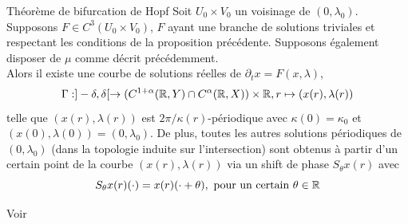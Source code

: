\documentclass[memoire.tex]{subfiles}
\begin{document}
    \begin{theobox}{Théorème de bifurcation de Hopf}{}
        Soit $U_0\times V_0$ un voisinage de $(0,\lambda_0)$. Supposons $F\in C^3(U_0\times V_0)$, $F$ ayant une branche de solutions triviales et respectant les conditions de la proposition précédente. Supposons également disposer de $\mu$ comme décrit précédemment.\\
        Alors il existe une courbe de solutions réelles de $\partial_t x=F(x,\lambda)$,
        \begin{equation*}
            \Gamma: ]-\delta,\delta[\rightarrow (C^{1+\alpha}(\mathbb{R},Y)\cap C^{\alpha}(\mathbb{R},X))\times \mathbb{R}, r\mapsto (x(r),\lambda(r))
        \end{equation*}
        telle que $(x(r),\lambda(r))$ est $2\pi/\kappa(r)$-périodique avec $\kappa(0)=\kappa_0$ et $(x(0),\lambda(0))=(0,\lambda_0)$. De plus, toutes les autres solutions périodiques de $(0,\lambda_0)$ (dans la topologie induite sur l'intersection) sont obtenus à partir d'un certain point de la courbe $(x(r),\lambda(r))$ via un shift de phase $S_\theta x(r)$
        avec 
        \begin{equation*}
            S_{\theta}x(r)(\cdot)=x(r)(\cdot+\theta),\text{ pour un certain $\theta\in\mathbb{R}$}
        \end{equation*}
    \end{theobox}
    \begin{preuve}
        Voir \cite{kielhoefer2012bta}
    \end{preuve}
    
    \newpage
\end{document}
